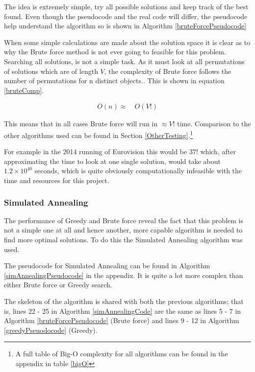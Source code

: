 \documentclass[12pt]{report}
\begin{document}
The idea is extremely simple, try all possible solutions and keep track of the best found. Even though the pseudocode and the real code will differ, the pseudocode help understand the algorithm so is shown in Algorithm \ref{bruteForcePseudocode}

When some simple calculations are made about the solution space it is clear as to why the Brute force method is not ever going to feasible for this problem. Searching all solutions, is not a simple task. As it must look at all permutations of solutions which are of length $V$, the complexity of Brute force follows the number of permutations for n distinct objects.\cite{Permutation}. This is shown in equation \ref{bruteComp}.

\begin{equation}\label{bruteComp}
\begin{aligned}
	O(n) \approx{} & \ O(V!)
\end{aligned}
\end{equation}

This means that in all cases Brute force will run in $\approx V!$ time. Comparison to the other algorithms used can be found in Section \ref{OtherTesting}.\footnote{A full table of Big-O complexity for all algorithms can be found in the appendix in table \ref{bigO}}

For example in the 2014 running of Eurovision this would be $37!$ which, after approximating the time to look at one single solution, would take about $1.2\times10^{40}$ seconds, which is quite obviously computationally infeasible with the time and resources for this project.

\subsubsection{Simulated Annealing}
The performance of Greedy and Brute force reveal the fact that this problem is not a simple one at all and hence another, more capable algorithm is needed to find more optimal solutions. To do this the Simulated Annealing algorithm\cite{Kirkpatrick} was used.

The pseudocode for Simulated Annealing can be found in Algorithm \ref{simAnnealingPseudocode} in the appendix. It is quite a lot more complex than either Brute force or Greedy search.

The skeleton of the algorithm is shared with both the previous algorithms; that is, lines 22 - 25 in Algorithm \ref{simAnnealingCode} are the same as lines 5 - 7 in Algorithm \ref{bruteForcePseudocode} (Brute force) and lines 9 - 12 in Algorithm \ref{greedyPseuodocode} (Greedy).
\end{document}
